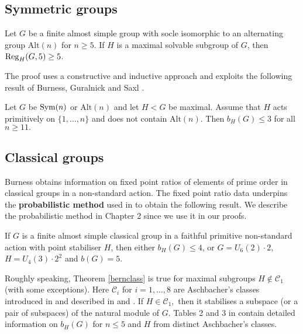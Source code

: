 \subsection*{Symmetric groups}


\begin{Th}
Let $G$ be a finite almost simple group with socle isomorphic to an alternating group $\mathrm{Alt}(n)$ for $n\ge 5.$ If $H$ is a maximal solvable subgroup of $G$, then $\mathrm{Reg}_H(G,5)\ge 5$.
\end{Th}

 The proof uses a constructive and inductive approach and exploits  the following result of Burness, Guralnick and Saxl \cite{prim11}.

\begin{Th}
Let $G$ be  $\mathrm{Sym}(n)$ or $\mathrm{Alt}(n)$ and let $H<G$ be maximal.  Assume that $H$ acts primitively on $\{1, \ldots ,n\}$ and does not contain $\mathrm{Alt}(n)$. Then $b_H(G) \le 3$ for all $n \ge 11.$
\end{Th} 




\medskip

\subsection*{Classical groups}

  Burness \cite{fpr} obtains information on fixed point ratios of elements of prime order in classical groups in a non-standard action.
The fixed point ratio data underpins the {\bf probabilistic method} used in \cite{burness} to obtain the following result. We describe the probabilistic method in Chapter 2 since we use it in our proofs. 

\begin{Th}
\label{bernclass}
If $G$ is a finite almost simple classical group in a faithful primitive non-standard action with  point stabiliser $H$, then either $b_H(G) \le 4$, or $G = U_6 (2) \cdot 2$, $H = U_4 (3) \cdot 2^2$ and $b(G) = 5$.
\end{Th}

Roughly speaking, Theorem \ref{bernclass} is true for maximal subgroups $H \notin \mathcal{C}_1$ (with some exceptions). Here $\mathcal{C}_i$ for $i=1, \ldots, 8$ are Aschbacher's classes introduced in \cite{asch}   and described in \cite[\S 2.1]{maxlow}  and \cite[Chapter 4]{kleidlieb}.  If $H \in \mathcal{C}_1,$ then it stabilises a subspace (or a pair of subspaces) of the natural module of $G$. Tables 2 and 3 in \cite{burness} contain detailed information on $b_H(G)$ for $n\le 5$ and $H$ from distinct Aschbacher's classes.

